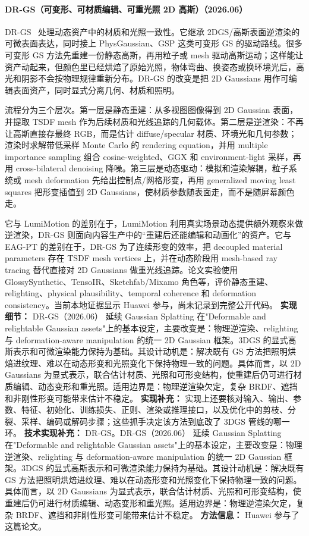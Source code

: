 \paragraph{DR-GS（可变形、可材质编辑、可重光照 2D 高斯）（2026.06）}
DR-GS~\cite{2606_29379} 处理动态资产中的材质和光照一致性。它继承 2DGS/高斯表面逆渲染的可微表面表达，同时接上 PhysGaussian、GSP 这类可变形 GS 的驱动路线。很多可变形 GS 方法先重建一份静态高斯，再用粒子或 mesh 驱动高斯运动；这样能让资产动起来，但颜色里已经烘焙了原始光照，物体弯曲、换姿态或换环境光后，高光和阴影不会按物理规律重新分布。DR-GS 的改变是把 2D Gaussians 用作可编辑表面资产，同时显式分离几何、材质和照明。

流程分为三个层次。第一层是静态重建：从多视图图像得到 2D Gaussian 表面，并提取 TSDF mesh 作为后续材质和光线追踪的几何载体。第二层是逆渲染：不再让高斯直接存最终 RGB，而是估计 diffuse/specular 材质、环境光和几何参数；渲染时求解带低采样 Monte Carlo 的 rendering equation，并用 multiple importance sampling 组合 cosine-weighted、GGX 和 environment-light 采样，再用 cross-bilateral denoising 降噪。第三层是动态驱动：模拟和渲染解耦，粒子系统或 mesh deformation 先给出控制点/网格形变，再用 generalized moving least squares 把形变插值到 2D Gaussians，使材质参数随表面走，而不是随屏幕颜色走。

它与 LumiMotion 的差别在于，LumiMotion 利用真实场景动态提供额外观察来做逆渲染，DR-GS 则面向内容生产中的“重建后还能编辑和动画化”的资产。它与 EAG-PT 的差别在于，DR-GS 为了连续形变的效率，把 decoupled material parameters 存在 TSDF mesh vertices 上，并在动态阶段用 mesh-based ray tracing 替代直接对 2D Gaussians 做重光线追踪。论文实验使用 GlossySynthetic、TensoIR、Sketchfab/Mixamo 角色等，评价静态重建、relighting、physical plausibility、temporal coherence 和 deformation consistency。当前本地证据显示 Huawei 参与，尚未记录到完整公开代码。
\textbf{实现细节：} DR-GS（2026.06） 延续 Gaussian Splatting 在"Deformable and relightable Gaussian assets"上的基本设定，主要改变是：物理逆渲染、relighting 与 deformation-aware manipulation 的统一 2D Gaussian 框架。3DGS 的显式高斯表示和可微渲染能力保持为基础。其设计动机是：解决既有 GS 方法把照明烘焙进纹理、难以在动态形变和光照变化下保持物理一致的问题。具体而言，以 2D Gaussians 为显式表示，联合估计材质、光照和可形变结构，使重建后仍可进行材质编辑、动态变形和重光照。适用边界是：物理逆渲染欠定，复杂 BRDF、遮挡和非刚性形变可能带来估计不稳定。
\textbf{实现补充：} 实现上还要核对输入、输出、参数、特征、初始化、训练损失、正则、渲染或推理接口，以及优化中的剪枝、分裂、采样、编码或解码步骤；这些抓手决定该方法到底改了 3DGS 管线的哪一环。
\textbf{技术实现补充：} DR-GS。DR-GS（2026.06） 延续 Gaussian Splatting 在"Deformable and relightable Gaussian assets"上的基本设定，主要改变是：物理逆渲染、relighting 与 deformation-aware manipulation 的统一 2D Gaussian 框架。3DGS 的显式高斯表示和可微渲染能力保持为基础。其设计动机是：解决既有 GS 方法把照明烘焙进纹理、难以在动态形变和光照变化下保持物理一致的问题。具体而言，以 2D Gaussians 为显式表示，联合估计材质、光照和可形变结构，使重建后仍可进行材质编辑、动态变形和重光照。适用边界是：物理逆渲染欠定，复杂 BRDF、遮挡和非刚性形变可能带来估计不稳定。
\textbf{方法信息：} Huawei 参与了这篇论文。

